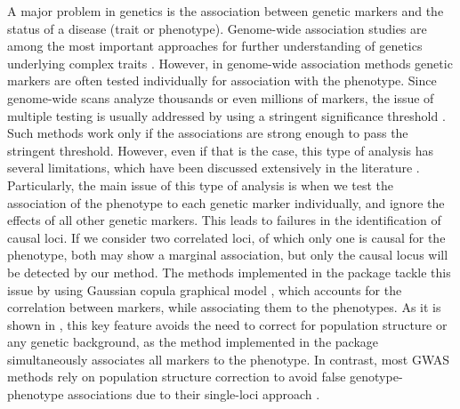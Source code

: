 A major problem in genetics is the association between genetic markers and the status of a disease (trait or phenotype). Genome-wide association studies are among the most important approaches for further understanding of genetics underlying complex traits \citep{welter2013nhgri, kruijer2020reconstruction}. However, in genome-wide association methods genetic markers are often tested individually for association with the phenotype. Since genome-wide scans analyze thousands or even millions of markers, the issue of multiple testing is usually addressed by using a stringent significance threshold \citep{panagiotou2011should}. Such methods work only if the associations are strong enough to pass the stringent threshold. However, even if that is the case, this type of analysis has several limitations, which have been discussed extensively in the literature \citep{ hoggart2008simultaneous, he2010variable, rakitsch2012lasso, buzdugan2016assessing}. %
Particularly, the main issue of this type of analysis is when we test the association of the phenotype to each genetic marker individually, and ignore the effects of all other genetic markers. This leads to failures in the identification of causal loci. %
If we consider two correlated loci, of which only one is causal for the phenotype, both may show a marginal association, but only the causal locus will be detected by our method. The methods implemented in the  package tackle this issue by using Gaussian copula graphical model \citep{klaassen1997efficient, hoff2007extending}, which accounts for the correlation between markers, while associating them to the phenotypes. As it is shown in \citet{klasen2016multi}, this key feature avoids the need to correct for population structure or any genetic background, as the method implemented in the  package simultaneously associates all markers to the phenotype. %
 In contrast, most GWAS methods rely on population structure correction to avoid false genotype-phenotype associations due to their single-loci approach \citep{yu2006unified, kang2008efficient, kang2010variance, lippert2011fast}.
 

